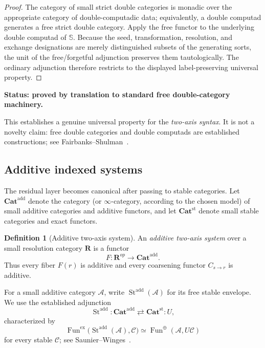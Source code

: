 \documentclass[11pt]{article}
\theoremstyle{definition}
\newtheorem{definition}[theorem]{Definition}
\theoremstyle{remark}
\newcommand{\Rcat}{\mathbf R}
\newcommand{\status}[1]{\textbf{Status: #1.}}
\begin{document}
\begin{proof}
The category of small strict double categories is monadic over the appropriate category of double-computadic data; equivalently, a double computad generates a free strict double category. Apply the free functor to the underlying double computad of $\mathbb S$. Because the seed, transformation, resolution, and exchange designations are merely distinguished subsets of the generating sorts, the unit of the free/forgetful adjunction preserves them tautologically. The ordinary adjunction therefore restricts to the displayed label-preserving universal property.
\end{proof}

\status{proved by translation to standard free double-category machinery}

This establishes a genuine universal property for the \emph{two-axis syntax}. It is not a novelty claim: free double categories and double computads are established constructions; see Fairbanks--Shulman~\cite{FairbanksShulman2026}.

\subsection{Additive indexed systems}

The residual layer becomes canonical after passing to stable categories. Let $\mathbf{Cat}^{\mathrm{add}}$ denote the category (or $\infty$-category, according to the chosen model) of small additive categories and additive functors, and let $\mathbf{Cat}^{\mathrm{st}}$ denote small stable categories and exact functors.

\begin{definition}[Additive two-axis system]
An \emph{additive two-axis system} over a small resolution category $\Rcat$ is a functor
\[
F:\Rcat^{op}\longrightarrow \mathbf{Cat}^{\mathrm{add}}.
\]
Thus every fiber $F(r)$ is additive and every coarsening functor $C_{s\to r}$ is additive.
\end{definition}

For a small additive category $\mathcal A$, write $\operatorname{St}^{\mathrm{add}}(\mathcal A)$ for its free stable envelope. We use the established adjunction
\[
\operatorname{St}^{\mathrm{add}}:
\mathbf{Cat}^{\mathrm{add}}
\rightleftarrows
\mathbf{Cat}^{\mathrm{st}}:U,
\]
characterized by
\[
\operatorname{Fun}^{\mathrm{ex}}
\bigl(\operatorname{St}^{\mathrm{add}}(\mathcal A),\mathcal C\bigr)
\simeq
\operatorname{Fun}^{\oplus}(\mathcal A,U\mathcal C)
\]
for every stable $\mathcal C$; see Saunier--Winges~\cite{SaunierWinges2026}.
\end{document}
